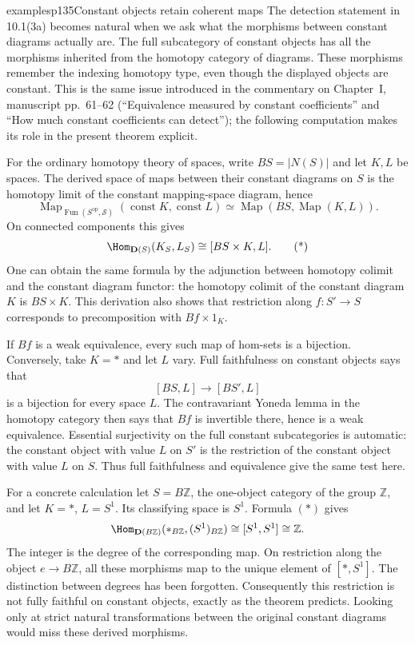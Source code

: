 \begin{dcomment}{examples}{p135}{Constant objects retain coherent maps}
The detection statement in 10.1(3a) becomes natural when we ask what the morphisms between constant diagrams actually are. The full subcategory of constant objects has all the morphisms inherited from the homotopy category of diagrams. These morphisms remember the indexing homotopy type, even though the displayed objects are constant. This is the same issue introduced in the commentary on Chapter~I, manuscript pp.~61--62 (``Equivalence measured by constant coefficients'' and ``How much constant coefficients can detect''); the following computation makes its role in the present theorem explicit.

For the ordinary homotopy theory of spaces, write $BS=|N(S)|$ and let $K,L$ be spaces. The derived space of maps between their constant diagrams on $S$ is the homotopy limit of the constant mapping-space diagram, hence
\[
 \operatorname{Map}_{\operatorname{Fun}(S^{\mathrm{op}},\mathcal S)}
       (\operatorname{const}K,\operatorname{const}L)
 \simeq \operatorname{Map}(BS,\operatorname{Map}(K,L)).
\]
On connected components this gives
\[
 \Hom_{\mathbf D(S)}(K_S,L_S)\cong[BS\times K,L].\tag{*}
\]
One can obtain the same formula by the adjunction between homotopy colimit and the constant diagram functor: the homotopy colimit of the constant diagram $K$ is $BS\times K$. This derivation also shows that restriction along $f:S'\longrightarrow S$ corresponds to precomposition with $Bf\times1_K$.

If $Bf$ is a weak equivalence, every such map of hom-sets is a bijection. Conversely, take $K=*$ and let $L$ vary. Full faithfulness on constant objects says that
\[
 [BS,L]\longrightarrow[BS',L]
\]
is a bijection for every space $L$. The contravariant Yoneda lemma in the homotopy category then says that $Bf$ is invertible there, hence is a weak equivalence. Essential surjectivity on the full constant subcategories is automatic: the constant object with value $L$ on $S'$ is the restriction of the constant object with value $L$ on $S$. Thus full faithfulness and equivalence give the same test here.

For a concrete calculation let $S=B\mathbb Z$, the one-object category of the group $\mathbb Z$, and let $K=*$, $L=S^1$. Its classifying space is $S^1$. Formula $(*)$ gives
\[
 \Hom_{\mathbf D(B\mathbb Z)}(*_{B\mathbb Z},(S^1)_{B\mathbb Z})
 \cong[S^1,S^1]\cong\mathbb Z.
\]
The integer is the degree of the corresponding map. On restriction along the object $e\longrightarrow B\mathbb Z$, all these morphisms map to the unique element of $[*,S^1]$. The distinction between degrees has been forgotten. Consequently this restriction is not fully faithful on constant objects, exactly as the theorem predicts. Looking only at strict natural transformations between the original constant diagrams would miss these derived morphisms.


\end{dcomment}
